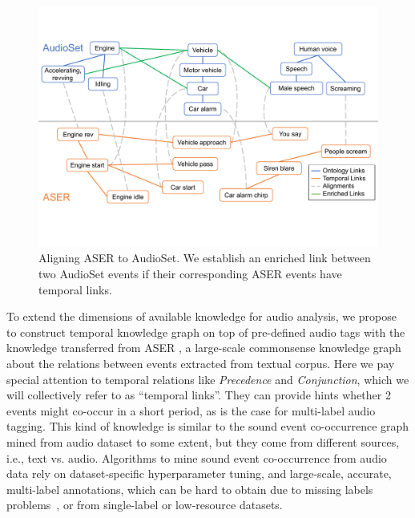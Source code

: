 \begin{figure}[htbp]
  \setlength{\abovecaptionskip}{0.cm}
\setlength{\belowcaptionskip}{-0.5cm}
  \centering
  \includegraphics[width=\linewidth]{figures/align1.pdf}
  \caption{Aligning ASER to AudioSet. We establish an enriched link between two AudioSet events if their corresponding ASER events have temporal links.}
  \label{fig:align}
\end{figure}

To extend the dimensions of available knowledge for audio analysis, 
we propose to construct temporal knowledge graph on top of pre-defined audio tags 
with the knowledge transferred from ASER \citep{zhang2020aser}, 
a large-scale commonsense knowledge graph about the relations between events extracted 
from textual corpus. Here we pay special attention to temporal relations 
like \textit{Precedence} and \textit{Conjunction}, 
which we will collectively refer to as ``temporal links''.
They can provide hints whether 2 events might co-occur in a short period, 
as is the case for multi-label audio tagging. 
This kind of knowledge is similar to the sound event co-occurrence graph mined 
from audio dataset \citep{shrivaslava2020mt, wang2020modeling} to some extent, 
but they come from different sources, i.e., text vs. audio. 
Algorithms to mine sound event co-occurrence from audio data
rely on dataset-specific hyperparameter tuning, 
and large-scale, accurate, multi-label annotations, 
which can be hard to obtain due to missing labels problems~\citep{fonseca2020addressing},
or from single-label or low-resource datasets.

